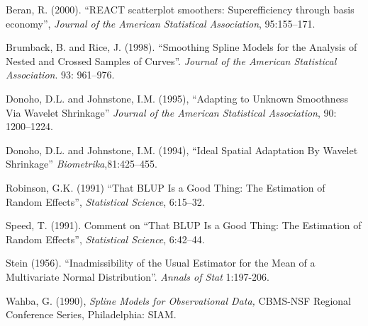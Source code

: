 \begin{thebibliography}{}

Beran, R. (2000). ``REACT scatterplot smoothers: {S}uperefficiency
through basis economy'',
{\it Journal of the American Statistical Association},
95:155--171.


Brumback, B. and Rice, J. (1998). ``Smoothing Spline Models for the Analysis
of Nested and Crossed  Samples of Curves''. {\it Journal of the
  American Statistical Association}. 93: 961--976.

Donoho, D.L. and Johnstone, I.M. (1995), ``Adapting to Unknown
         Smoothness Via Wavelet Shrinkage'' {\it Journal of the
         American Statistical Association}, 90: 1200--1224.

Donoho, D.L. and Johnstone, I.M. (1994),  ``Ideal Spatial Adaptation
         By Wavelet Shrinkage'' {\it Biometrika},81:425--455.

Robinson, G.K. (1991) ``That BLUP Is a Good Thing: The Estimation of Random
                 Effects'', {\it Statistical Science}, 6:15--32.

Speed, T. (1991). Comment on ``That BLUP Is a Good Thing: {T}he Estimation of
                 Random Effects'', {\it Statistical Science}, 6:42--44.

Stein (1956).  ``Inadmissibility of the Usual Estimator for the Mean of a
                 Multivariate Normal Distribution''. 
{\it Annals of Stat} 1:197-206.


Wahba, G. (1990), {\it Spline Models for Observational Data,} CBMS-NSF
Regional Conference Series, Philadelphia: SIAM.

\end{thebibliography}







